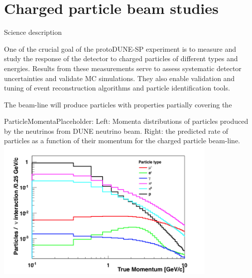 
\section{Charged particle beam studies}
Science description


One of the crucial goal of the protoDUNE-SP experiment is to measure and study the response of the detector to charged
particles of different types and energies. Results from these measurements serve to
assess systematic detector uncertainties and validate MC simulations. They also enable
validation and tuning of event reconstruction algorithms and particle identification tools.

The beam-line will produce particles with properties partially covering the 

\begin{cdrfigure}[Placeholder ]{ParticleMomenta}{Placeholder: Left: Momenta distributions of particles produced by the neutrinos from DUNE neutrino beam. Right: the predicted rate of particles as a function of their momentum for the charged particle beam-line.}
  \includegraphics[width=0.8\textwidth]{figures/True_Momenta_per_Particle_9_2_1_0_logy_logx}
\end{cdrfigure}

